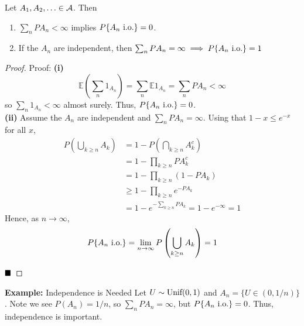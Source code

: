 \begin{theorem}
    Let $A_1, A_2, \ldots \in \cal{A}$. Then
    \begin{enumerate}[label = (\roman*)]
        \item $\sum_{n} PA_n < \infty$ implies $P\{A_n \tt{ i.o.}\} = 0$.
        \item If the $A_n$ are independent, then $\sum_{n} PA_n = \infty \implies P\{A_n \tt{ i.o.}\} = 1$
    \end{enumerate}
\end{theorem}
\begin{proof}{Proof:}
    \textbf{(i)}
    \[ \mathbb{E}\left(\sum_{n} 1_{A_n}\right) = \sum_{n} \mathbb{E}1_{A_n} = \sum_{n} PA_n < \infty \]
    so $\sum_{n} 1_{A_n} < \infty$ almost surely. Thus, $P\{A_n \tt{ i.o.}\} = 0$.\\

    \textbf{(ii)} Assume the $A_n$ are independent and $\sum_{n} PA_n = \infty$. Using that $1 - x \leq e^{-x}$ for all $x$,
    \begin{align*}
        P\left(\bigcup_{k \geq n} A_k\right) &= 1 - P\left(\bigcap_{k \geq n} A_k^{c}\right)\\
        &= 1 - \prod_{k \geq n} PA_k^{c}\\
        &= 1 - \prod_{k \geq n}(1 - PA_k)\\
        &\geq 1 - \prod_{k \geq n} e^{-PA_k}\\
        &= 1 - e^{-\sum_{k \geq n} PA_k} = 1 - e^{-\infty} = 1
    \end{align*}
    Hence, as $n \to \infty$,
    \[ P\{A_n \tt{ i.o.}\} = \lim_{n \to \infty} P\left(\bigcup_{k \geq n} A_k\right) = 1 \]

    $\qed$
\end{proof}

\begin{example}{\textbf{Example:} Independence is Needed}
    Let $U \sim \tt{Unif}(0, 1)$ and $A_n = \{U \in (0, 1/n)\}$. Note we see $P(A_n) = 1/n$, so $\sum_{n} PA_n = \infty$, but $P\{A_n \tt{ i.o.}\} = 0$. Thus, independence is important.
\end{example}

